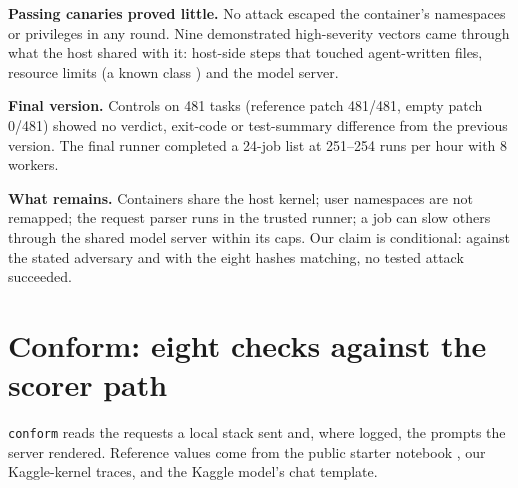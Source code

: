 

\textbf{Passing canaries proved little.} No attack escaped the container's namespaces or privileges in any round. Nine demonstrated high-severity vectors came through what the host shared with it: host-side steps that touched agent-written files, resource limits (a known class \cite{r13}) and the model server.

\textbf{Final version.} Controls on 481 tasks (reference patch 481/481, empty patch 0/481) showed no verdict, exit-code or test-summary difference from the previous version. The final runner completed a 24-job list at 251--254 runs per hour with 8 workers.

\textbf{What remains.} Containers share the host kernel; user namespaces are not remapped; the request parser runs in the trusted runner; a job can slow others through the shared model server within its caps. Our claim is conditional: against the stated adversary and with the eight hashes matching, no tested attack succeeded.

\section{Conform: eight checks against the scorer path}\label{sec:4}

\texttt{conform} reads the requests a local stack sent and, where logged, the prompts the server rendered. Reference values come from the public starter notebook \cite{r10}, our Kaggle-kernel traces, and the Kaggle model's chat template.

